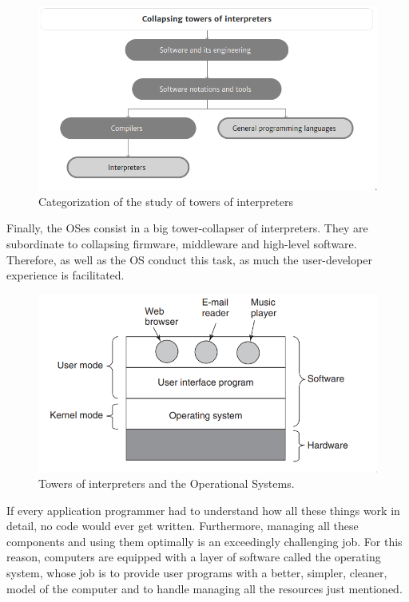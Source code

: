 \documentclass[
12pt,				%
openright,			%
oneside,			%
a4paper,			%
brazil,				%
english,			%
]{abntex2}
\begin{document}
\begin{figure}[ht]
  \centering
 \caption{\label{fig:tower2} Categorization of the study of towers of interpreters}
  \includegraphics[width=0.5\linewidth]{torres2.png}
\end{figure}

Finally, the OSes consist in a big tower-collapser of
interpreters. They are subordinate to collapsing firmware, middleware
and high-level software. Therefore, as well as the OS conduct this task,
as much the user-developer experience is facilitated.

\begin{figure}[ht]
  \centering
 \caption{\label{fig:os} Towers of interpreters and the Operational Systems.}
  \includegraphics[width=0.5\linewidth]{tower-os.png}
\end{figure}

\begin{citacao}
If every application programmer had to understand how all these things work in detail, no code would ever
get written. Furthermore, managing all these components and using them optimally
is an exceedingly challenging job. For this reason, computers are equipped with a
layer of software called the operating system, whose job is to provide
user programs with a better, simpler, cleaner, model of the computer
and to handle managing all the resources just mentioned. \cite{tanenbaum2015modern}
\end{citacao}
\end{document}
